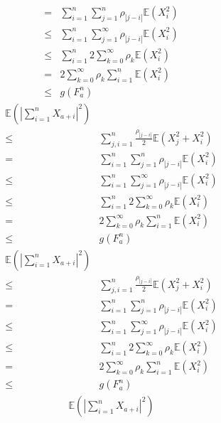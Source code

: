 \documentclass{ctexart}
\begin{document}
\begin{remark}
\begin{equation}
\begin{aligned}
      =& \sum_{i=1}^{n} \sum_{j=1}^{n}\rho_{|j-i|}\mathbb{E}(X_i^2)\\
      \leq & \sum_{i=1}^{n} \sum_{j=1}^{\infty} \rho_{|j-i|}\mathbb{E}(X_i^2)\\
      \leq & \sum_{i=1}^{n} 2\sum_{k=0}^{\infty} \rho_k \mathbb{E}(X_i^2)\\
      =& 2\sum_{k=0}^{\infty}\rho_k  \sum_{i=1}^{n}\mathbb{E}(X_i^2)\\
      \leq & g(F_a^n)
    \end{aligned}
  \end{equation}
  \begin{equation}
    \begin{aligned}
      \mathbb{E}(|\sum_{i=1}^{n}X_{a+i}|^2) \\
      \leq & \sum_{j,i = 1}^{n} \frac{\rho_{|j-i|}}{2}\mathbb{E}(X_j^2 + X_i^2)\\
      =& \sum_{i=1}^{n} \sum_{j=1}^{n}\rho_{|j-i|}\mathbb{E}(X_i^2)\\
      \leq & \sum_{i=1}^{n} \sum_{j=1}^{\infty} \rho_{|j-i|}\mathbb{E}(X_i^2)\\
      \leq & \sum_{i=1}^{n} 2\sum_{k=0}^{\infty} \rho_k \mathbb{E}(X_i^2)\\
      =& 2\sum_{k=0}^{\infty}\rho_k  \sum_{i=1}^{n}\mathbb{E}(X_i^2)\\
      \leq & g(F_a^n)
    \end{aligned}
  \end{equation}
  \begin{equation}
    \begin{aligned}
      \mathbb{E}(|\sum_{i=1}^{n}X_{a+i}|^2) \\
      \leq & \sum_{j,i = 1}^{n} \frac{\rho_{|j-i|}}{2}\mathbb{E}(X_j^2 + X_i^2)\\
      =& \sum_{i=1}^{n} \sum_{j=1}^{n}\rho_{|j-i|}\mathbb{E}(X_i^2)\\
      \leq & \sum_{i=1}^{n} \sum_{j=1}^{\infty} \rho_{|j-i|}\mathbb{E}(X_i^2)\\
      \leq & \sum_{i=1}^{n} 2\sum_{k=0}^{\infty} \rho_k \mathbb{E}(X_i^2)\\
      =& 2\sum_{k=0}^{\infty}\rho_k  \sum_{i=1}^{n}\mathbb{E}(X_i^2)\\
      \leq & g(F_a^n)
    \end{aligned}
  \end{equation}
  \begin{equation}
    \begin{aligned}
      \mathbb{E}(|\sum_{i=1}^{n}X_{a+i}|^2) \\

\end{aligned}
\end{equation}
\end{remark}
\end{document}
